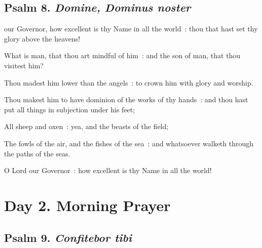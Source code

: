 \subsection{Psalm 8. \textit{Domine, Dominus noster}}

 our Governor, how excellent is thy Name in all the world~: thou that hast set thy glory above the heavens!\par
{}
What is man, that thou art mindful of him~: and the son of man, that thou visitest him?\par
{}Thou madest him lower than the angels~: to crown him with glory and worship.\par
{}Thou makest him to have dominion of the works of thy hands~: and thou hast put all things in subjection under his feet;\par
{}All sheep and oxen~: yea, and the beasts of the field;\par
{}The fowls of the air, and the fishes of the sea~: and whatsoever walketh through the paths of the seas.\par
{}O Lord our Governor~: how excellent is thy Name in all the world!\par

\section*{Day 2. Morning Prayer}

\subsection{Psalm 9. \textit{Confitebor tibi}}

